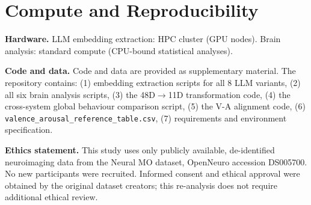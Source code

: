 \documentclass{article}
\begin{document}
\section{Compute and Reproducibility}
\label{app:compute}

\textbf{Hardware.}
LLM embedding extraction: HPC cluster (GPU nodes).
Brain analysis: standard compute (CPU-bound statistical analyses).

\textbf{Code and data.}
Code and data are provided as supplementary material.
The repository contains:
(1) embedding extraction scripts for all 8 LLM variants,
(2) all six brain analysis scripts,
(3) the 48D$\to$11D transformation code,
(4) the cross-system global behaviour comparison script,
(5) the V-A alignment code,
(6) \texttt{valence\_arousal\_reference\_table.csv},
(7) requirements and environment specification.

\textbf{Ethics statement.}
This study uses only publicly available, de-identified neuroimaging data from the
Neural MO dataset, OpenNeuro accession DS005700.
No new participants were recruited.
Informed consent and ethical approval were obtained by the original dataset creators;
this re-analysis does not require additional ethical review.
\end{document}
